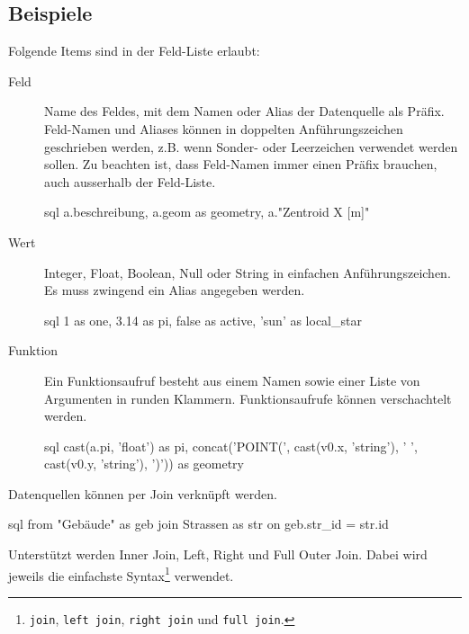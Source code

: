 \subsection{Beispiele}
Folgende Items sind in der Feld-Liste erlaubt:
\begin{description}
\item[Feld] Name des Feldes, mit dem Namen oder Alias der Datenquelle als Präfix. Feld-Namen und Aliases können in doppelten Anführungszeichen geschrieben werden, z.B. wenn Sonder- oder Leerzeichen verwendet werden sollen. Zu beachten ist, dass Feld-Namen immer einen Präfix brauchen, auch ausserhalb der Feld-Liste.
\begin{src}{sql}
a.beschreibung, a.geom as geometry, a."Zentroid X [m]"
\end{src}
\item[Wert] Integer, Float, Boolean, Null oder String in einfachen Anführungszeichen. Es muss zwingend ein Alias angegeben werden. 
\begin{src}{sql}
1 as one, 3.14 as pi, false as active, 'sun' as local_star
\end{src}
\item[Funktion] Ein Funktionsaufruf besteht aus einem Namen sowie einer Liste von Argumenten in runden Klammern. Funktionsaufrufe können verschachtelt werden.
\begin{src}{sql}
 cast(a.pi, 'float') as pi,
 concat('POINT(', cast(v0.x, 'string'), ' ', cast(v0.y, 'string'), ')')) as geometry
\end{src}
\end{description}

Datenquellen können per Join verknüpft werden.
\begin{src}{sql}
  from "Gebäude" as geb join Strassen as str on geb.str_id = str.id
\end{src}

Unterstützt werden Inner Join, Left, Right und Full Outer Join. Dabei wird jeweils die einfachste Syntax\footnote{\texttt{join}, \texttt{left join}, \texttt{right join} und \texttt{full join}.} verwendet.

